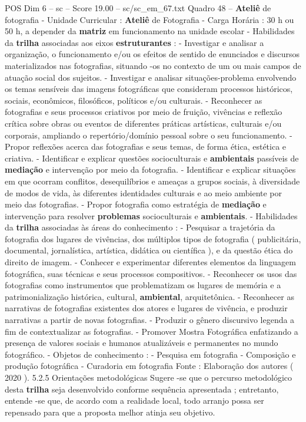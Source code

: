 \begin{textsample}{POS Dim 6 – sc – Score 19.00 – sc/sc\_em\_67.txt}
Quadro 48 – \textbf{Ateliê} de fotografia - Unidade Curricular : \textbf{Ateliê} de Fotografia - Carga Horária : 30 h ou 50 h, a depender da \textbf{matriz} em funcionamento na unidade escolar - Habilidades da \textbf{trilha} associadas aos eixos \textbf{estruturantes} : - Investigar e analisar a organização, o funcionamento e/ou os efeitos de sentido de enunciados e discursos materializados nas fotografias, situando -os no contexto de um ou mais campos de atuação social dos sujeitos. - Investigar e analisar situações-problema envolvendo os temas sensíveis das imagens fotográficas que consideram processos históricos, sociais, econômicos, filosóficos, políticos e/ou culturais. - Reconhecer as fotografias e seus processos criativos por meio de fruição, vivências e reflexão crítica sobre obras ou eventos de diferentes práticas artísticas, culturais e/ou corporais, ampliando o repertório/domínio pessoal sobre o seu funcionamento. - Propor reflexões acerca das fotografias e seus temas, de forma ética, estética e criativa. - Identificar e explicar questões socioculturais e \textbf{ambientais} passíveis de \textbf{mediação} e intervenção por meio da fotografia. - Identificar e explicar situações em que ocorram conflitos, desequilíbrios e ameaças a grupos sociais, à diversidade de modos de vida, às diferentes identidades culturais e ao meio ambiente por meio das fotografias. - Propor fotografia como estratégia de \textbf{mediação} e intervenção para resolver \textbf{problemas} socioculturais e \textbf{ambientais}. - Habilidades da \textbf{trilha} associadas às áreas do conhecimento : - Pesquisar a trajetória da fotografia dos lugares de vivências, dos múltiplos tipos de fotografia ( publicitária, documental, jornalística, artística, didática ou científica ), e da questão ética do direito de imagem. - Conhecer e experimentar diferentes elementos da linguagem fotográfica, suas técnicas e seus processos compositivos. - Reconhecer os usos das fotografias como instrumentos que problematizam os lugares de memória e a patrimonialização histórica, cultural, \textbf{ambiental}, arquitetônica. - Reconhecer as narrativas de fotografias existentes dos atores e lugares de vivência, e produzir narrativas a partir de novas fotografias. - Produzir o gênero discursivo legenda a fim de contextualizar as fotografias. - Promover Mostra Fotográfica enfatizando a presença de valores sociais e humanos atualizáveis e permanentes no mundo fotográfico. - Objetos de conhecimento : - Pesquisa em fotografia - Composição e produção fotográfica - Curadoria em fotografia Fonte : Elaboração dos autores ( 2020 ). 5.2.5 Orientações metodológicas Sugere -se que o percurso metodológico desta \textbf{trilha} seja desenvolvido conforme sequência apresentada ; entretanto, entende -se que, de acordo com a realidade local, todo arranjo possa ser repensado para que a proposta melhor atinja seu objetivo.

\end{textsample}
